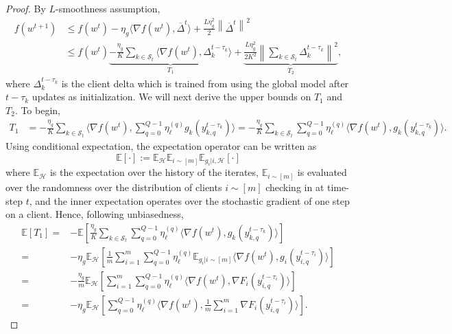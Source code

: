 \documentclass[twoside]{article}
\newcommand{\calS}{\mathcal{S}}
\newcommand{\norm}[1]{\left\lVert#1\right\rVert}
\begin{document}
\begin{proof}
By $L$-smoothness assumption,
\begin{equation}
    \begin{aligned}
        f(w^{t+1}) &\leq f(w^t) - \eta_g \langle \nabla f(w^t), \overline{\Delta}^t \rangle + \frac{L\eta^2_g}{2} \norm{\overline{\Delta}^t}^2 \\
       &\leq   f(w^t) \underbrace{-\frac{\eta_g}{K}\sum_{k\in \calS_t} \Big\langle \nabla f(w^t),  \Delta_{k}^{t-\tau_k} \Big\rangle}_{T_1} + \underbrace{\frac{L\eta^2_g}{2K^2} \norm{\sum_{k\in \calS_t} \Delta_{k}^{t-\tau_k}}^2}_{T_2},
    \end{aligned}
    \label{eq:lipchitz_expansion}
\end{equation}
where $\Delta_{k}^{t-\tau_k}$ is the client delta which is trained from using the global model after $t-\tau_k$ updates as initialization. We will next derive the upper bounds on $T_1$ and $T_2$. To begin,
\begin{equation}
    \begin{aligned}
        T_1 
        &= -\frac{\eta_g}{K} \sum_{k\in \calS_t}  \Big\langle \nabla f(w^t),  \sum_{q=0}^{Q-1} \eta^{(q)}_{\ell} g_k(y^{t-\tau_k}_{k,q}) \Big\rangle
        = - \frac{\eta_g}{K} \sum_{k\in \calS_t}  \sum_{q=0}^{Q-1} \eta^{(q)}_{\ell} \Big\langle \nabla f(w^t),   g_k(y^{t-\tau_k}_{k,q}) \Big\rangle.
    \end{aligned}
\end{equation}
Using conditional expectation, the expectation operator can be written as 
\begin{equation*}
    \mathbb{E}[\cdot]:= \mathbb{E}_{\mathcal{H}} \mathbb{E}_{i \sim [m]} \mathbb{E}_{g_i | i, \mathcal{H}}[\cdot]
\end{equation*}
where $\mathbb{E}_{\mathcal{H}}$ is the expectation over the history of the iterates, $\mathbb{E}_{i \sim [m]}$ is evaluated over the randomness over the distribution of clients $i \sim [m]$ checking in at time-step $t$, and the inner expectation operates over the stochastic gradient of one step on a client. Hence, following unbiasedness, 
\begin{equation*}
    \begin{aligned}
            \mathbb{E}[T_1] =&  - \mathbb{E} \left[  \frac{\eta_g}{K}  \sum_{k\in \calS_t} \sum_{q=0}^{Q-1} \eta^{(q)}_{\ell}  \Big\langle \nabla f(w^t),   g_k(y^{t-\tau_k}_{k,q}) \Big\rangle \right] \\
            =& - \eta_g \mathbb{E}_{\mathcal{H}} \left[ \frac{1}{m}   \sum_{i=1}^m \sum_{q=0}^{Q-1} \eta^{(q)}_{\ell}  \mathbb{E}_{g_i | i\sim[m]}  \Big\langle \nabla f(w^t),    g_i(y^{t-\tau_i}_{i,q})  \Big\rangle \right] \\
            =& - \frac{\eta_g}{m} \mathbb{E}_{\mathcal{H}} \left[  \sum_{i=1}^m \sum_{q=0}^{Q-1} \eta^{(q)}_{\ell} \Big\langle \nabla f(w^t),   \nabla F_i(y^{t-\tau_i}_{i,q})  \Big\rangle \right] \\
            =& - \eta_g \mathbb{E}_{\mathcal{H}} \left[ \sum_{q=0}^{Q-1} \eta^{(q)}_{\ell}  \Big\langle \nabla f(w^t),   \frac{1}{m}\sum_{i=1}^m \nabla F_i(y^{t-\tau_i}_{i,q}) \Big\rangle \right].
    \end{aligned}
\end{equation*}


\end{proof}
\end{document}
